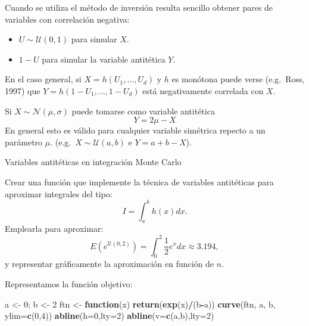 \documentclass[
]{book}
\newenvironment{Shaded}{\begin{snugshade}}{\end{snugshade}}
\newcommand{\ControlFlowTok}[1]{\textcolor[rgb]{0.13,0.29,0.53}{\textbf{#1}}}
\newcommand{\DataTypeTok}[1]{\textcolor[rgb]{0.13,0.29,0.53}{#1}}
\newcommand{\DecValTok}[1]{\textcolor[rgb]{0.00,0.00,0.81}{#1}}
\newcommand{\KeywordTok}[1]{\textcolor[rgb]{0.13,0.29,0.53}{\textbf{#1}}}
\newcommand{\NormalTok}[1]{#1}
\newcommand{\OperatorTok}[1]{\textcolor[rgb]{0.81,0.36,0.00}{\textbf{#1}}}
\newcommand{\StringTok}[1]{\textcolor[rgb]{0.31,0.60,0.02}{#1}}
\theoremstyle{break}
\theoremstyle{definition}
\theoremstyle{definition}
\theoremstyle{definition}
\theoremstyle{remark}
\let\BeginKnitrBlock\begin \let\EndKnitrBlock\end
\begin{document}
Cuando se utiliza el método de inversión resulta sencillo obtener
pares de variables con correlación negativa:

\begin{itemize}
\item
  \(U\sim \mathcal{U}\left( 0,1\right)\) para simular \(X\).
\item
  \(1-U\) para simular la variable antitética \(Y\).
\end{itemize}

En el caso general, si \(X=h\left( U_{1},\ldots,U_{d}\right)\) y
\(h\) es monótona puede verse (e.g.~Ross, 1997) que
\(Y=h\left( 1-U_{1},\ldots,1-U_{d}\right)\) está negativamente
correlada con \(X\).

Si \(X\sim \mathcal{N}(\mu,\sigma)\) puede tomarse como variable
antitética \[Y=2\mu-X\]
En general esto es válido para cualquier variable
simétrica repecto a un parámetro \(\mu\).
(e.g.~\(X\sim \mathcal{U}(a,b)\) e \(Y=a+b-X\)).

\BeginKnitrBlock{exercise}
\protect\hypertarget{exr:mc-integrala}{}{\label{exr:mc-integrala} }Variables antitéticas en integración Monte Carlo
\EndKnitrBlock{exercise}

Crear una función que implemente la técnica de variables antitéticas para aproximar integrales del tipo:
\[I=\int_{a}^{b}h\left(  x\right)  dx.\]
Emplearla para aproximar:
\[E\left(  e^{\mathcal{U}(0,2)}\right)  =\int_{0}^{2}\frac{1}{2}e^{x}dx\approx3.194,\label{integralmc}\]
y representar gráficamente la aproximación en función de \(n\).

Representamos la función objetivo:

\begin{Shaded}
\begin{Highlighting}[]
\NormalTok{a <-}\StringTok{ }\DecValTok{0}\NormalTok{; b <-}\StringTok{ }\DecValTok{2}
\NormalTok{ftn <-}\StringTok{ }\ControlFlowTok{function}\NormalTok{(x) }\KeywordTok{return}\NormalTok{(}\KeywordTok{exp}\NormalTok{(x)}\OperatorTok{/}\NormalTok{(b}\OperatorTok{-}\NormalTok{a))}
\KeywordTok{curve}\NormalTok{(ftn, a, b, }\DataTypeTok{ylim=}\KeywordTok{c}\NormalTok{(}\DecValTok{0}\NormalTok{,}\DecValTok{4}\NormalTok{))}
\KeywordTok{abline}\NormalTok{(}\DataTypeTok{h=}\DecValTok{0}\NormalTok{,}\DataTypeTok{lty=}\DecValTok{2}\NormalTok{)}
\KeywordTok{abline}\NormalTok{(}\DataTypeTok{v=}\KeywordTok{c}\NormalTok{(a,b),}\DataTypeTok{lty=}\DecValTok{2}\NormalTok{)}
\end{Highlighting}
\end{Shaded}
\end{document}
